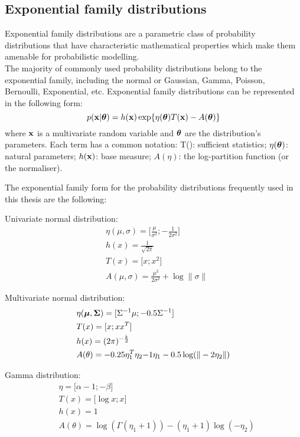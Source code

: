 \subsection{Exponential family distributions} \label{section:exponential_family}

Exponential family distributions are a parametric class of probability distributions that have characteristic mathematical properties which make them amenable for probabilistic modelling.\\
The majority of commonly used probability distributions belong to the exponential family, including the normal or Gaussian, Gamma, Poisson, Bernoulli, Exponential, etc. Exponential family distributions can be represented in the following form:
\begin{equation} \label{eq:exponential_family}
	p({\bf x}|\mbox{\boldmath $\theta$}) = h({\bf x}) \exp \{ \eta(\mbox{\boldmath $\theta$}) T({\bf x}) - A(\mbox{\boldmath $\theta$}) \}
\end{equation}
where ${\bf x}$ is a multivariate random variable and $\mbox{\boldmath $\theta$}$ are the distribution's parameters. Each term has a common notation: T(\bfx): sufficient statistics; $\eta(\mbox{\boldmath $\theta$})$: natural parameters; $h({\bf x})$: base measure; $A(\eta)$: the log-partition function (or the normaliser).

The exponential family form for the probability distributions frequently used in this thesis are the following:

Univariate normal distribution:
\begin{align*}
	& \eta(\mu,\sigma) = \lbrack \frac{\mu}{\sigma^2}; -\frac{1}{2\sigma^2} \rbrack \\
	& h(x) = \frac{1}{\sqrt{2\pi}} \\
	& T(x) = \lbrack x; x^2 \rbrack \\
	& A(\mu,\sigma) = \frac{\mu^2}{2\sigma^2} + \log \| \sigma \|
\end{align*}

Multivariate normal distribution:
\begin{align*}
	& \eta(\mbox{\boldmath $\mu$},\mbox{\boldmath $\Sigma$})  = \lbrack\Sigma^{-1} \mu; -0.5\Sigma^{-1} \rbrack \\
	& T(x) = \lbrack x; xx^T \rbrack \\
	& h(x) = (2\pi)^{-\frac{k}{2}} \\
	& A(\theta) = -0.25\eta_1^T \eta_2{-1} \eta_1 - 0.5\log(\|-2\eta_2\|)
\end{align*}

Gamma distribution:
\begin{align*}
	& \eta = \lbrack \alpha - 1; -\beta \rbrack \\
	& T(x) = \lbrack \log x; x \rbrack \\
	& h(x) = 1 \\
	& A(\theta) = \log(\Gamma(\eta_1 + 1)) - (\eta_1 + 1) \log(-\eta_2)
\end{align*}

